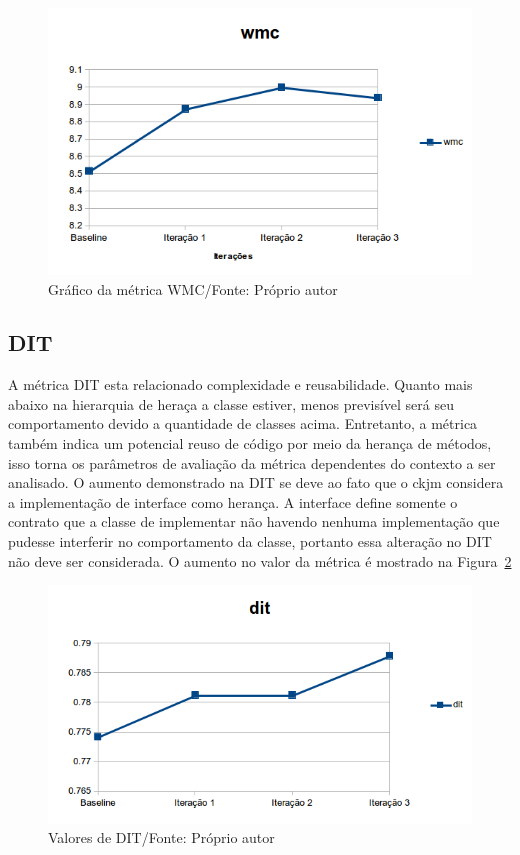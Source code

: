\begin{figure}[h]
	\centering
	\includegraphics{img/wmc.png}
	\caption{Gráfico da métrica WMC/Fonte: Próprio autor} 
	\label{fig:wmc}
\end{figure}


\subsection{DIT}

A métrica DIT esta relacionado complexidade e reusabilidade. Quanto mais abaixo
na hierarquia de heraça a classe estiver, menos previsível será seu
comportamento devido a quantidade de classes acima. Entretanto, a métrica também
indica um potencial reuso de código por meio da herança de métodos, isso torna
os parâmetros de avaliação da métrica dependentes do contexto a ser analisado.
O aumento demonstrado na DIT se deve ao fato que o ckjm considera a
implementação de interface como herança. A interface define somente o contrato
que a classe de implementar não havendo nenhuma implementação que pudesse
interferir no comportamento da classe, portanto essa alteração no DIT não deve
ser considerada. O aumento no valor da métrica é mostrado na Figura~\ref{fig:dit}

\begin{figure}[h]
	\centering
	\includegraphics{img/dit.png}
	\caption{Valores de DIT/Fonte: Próprio autor}
	\label{fig:dit}
\end{figure}


